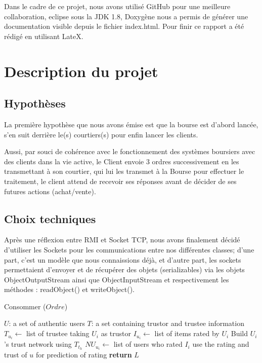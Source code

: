\documentclass[11pt]{article}
\begin{document}
Dans le cadre de ce projet, nous avons utilisé GitHub pour une meilleure collaboration, eclipse sous la JDK 1.8, Doxygène nous a permis de générer une documentation visible depuis le fichier index.html. \newline Pour finir ce rapport a été rédigé en utilisant LateX.


\section{Description du projet}

\subsection{Hypothèses}

La première hypothèse que nous avons émise est que la bourse est d'abord lancée, s'en suit derrière le(s) courtiers(s) pour enfin lancer les clients. \newline

Aussi, par souci de cohérence avec le fonctionnement des systèmes boursiers avec des clients dans la vie active, le Client envoie 3 ordres successivement en les transmettant à son courtier, qui lui les transmet à la Bourse pour effectuer le traitement, le client attend de recevoir ses réponses avant de décider de ses futures actions (achat/vente). \newline


\clearpage

\subsection{Choix techniques}

Après une réflexion  entre RMI et Socket TCP, nous avons finalement décidé d'utiliser les Sockets pour les communications entre nos différentes classes; d'une part, c'est un modèle que nous connaissions déjà, et d'autre part, les sockets permettaient d'envoyer et de récupérer des objets (serializables) via les objets ObjectOutputStream ainsi que ObjectInputStream et respectivement les méthodes : readObject() et writeObject(). \newline 


\begin{algorithm}
\caption{Consommer ($Ordre$)}
\label{alg:euclid}
\begin{algorithmic}[]
\State $U$: a set of authentic users
\State $T$: a set containing trustor and trustee information
    \State $T_{u_i} \gets$ list of trustee taking $U_i$ as trustor
    \State $I_{u_i} \gets$ list of items rated by $U_i$
    \State Build $U_i$'s trust network using $T_{t_h}$
    \State $NU_{u_i} \gets$ list of users who rated $I_i$
                \State use the rating and trust of $u$ for prediction of rating
            \EndIf
        \EndFor
    \EndFor
    \State \textbf{return} $L$
    \EndProcedure
\end{algorithmic}
\end{algorithm}
\end{document}
